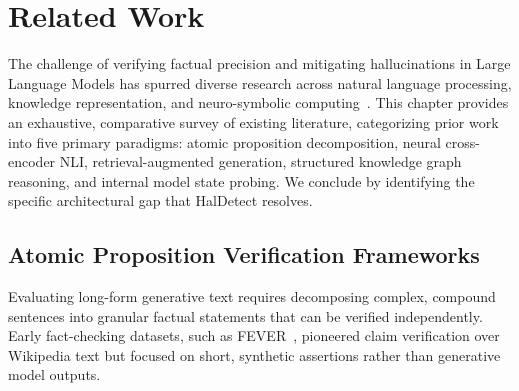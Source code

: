 \chapter{Related Work}
\label{ch:related_work}

The challenge of verifying factual precision and mitigating hallucinations in Large Language Models has spurred diverse research across natural language processing, knowledge representation, and neuro-symbolic computing~\cite{zhang2023sirens,huang2023survey,ji2023survey}. This chapter provides an exhaustive, comparative survey of existing literature, categorizing prior work into five primary paradigms: atomic proposition decomposition, neural cross-encoder NLI, retrieval-augmented generation, structured knowledge graph reasoning, and internal model state probing. We conclude by identifying the specific architectural gap that HalDetect resolves.

\section{Atomic Proposition Verification Frameworks}
\label{sec:atomic_fact_verification}

Evaluating long-form generative text requires decomposing complex, compound sentences into granular factual statements that can be verified independently. Early fact-checking datasets, such as \textsc{FEVER}~\cite{thorne2018fever}, pioneered claim verification over Wikipedia text but focused on short, synthetic assertions rather than generative model outputs.

